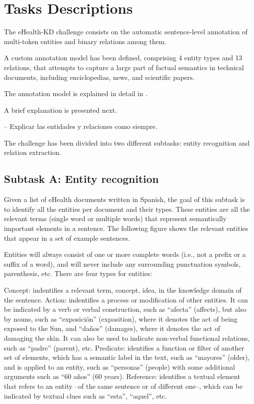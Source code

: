 \documentclass[a4paper,11pt,twocolumn,twoside]{article}
\begin{document}
\section{Tasks Descriptions}\label{sec:task}

The eHealth-KD challenge consists on the automatic sentence-level annotation
of multi-token entities and binary relations among them.

A custom annotation model has been defined, comprising 4 entity types and 13 relations,
that attempts to capture a large part of factual semantics in technical documents,
including enciclopedias, news, and scientific papers.

The annotation model is explained in detail in .

A brief explanation is presented next.

-- Explicar las entidades y relaciones como siempre.

The challenge has been divided into two different subtasks:
entity recognition and relation extraction.

\subsection{Subtask A: Entity recognition}
Given a list of eHealth documents written in Spanish, the goal of this subtask is to identify all the entities per document and their types. These entities are all the relevant terms (single word or multiple words) that represent semantically important elements in a sentence. The following figure shows the relevant entities that appear in a set of example sentences.

Entities will always consist of one or more complete words (i.e., not a prefix or a suffix of a word), and will never include any surrounding punctuation symbols, parenthesis, etc. There are four types for entities:

Concept: indentifies a relevant term, concept, idea, in the knowledge domain of the sentence.
Action: indentifies a process or modification of other entities. It can be indicated by a verb or verbal construction, such as “afecta” (affects), but also by nouns, such as “exposición” (exposition), where it denotes the act of being exposed to the Sun, and “daños” (damages), where it denotes the act of damaging the skin. It can also be used to indicate non-verbal functional relations, such as “padre” (parent), etc.
Predicate: identifies a function or filter of another set of elements, which has a semantic label in the text, such as “mayores” (older), and is applied to an entity, such as “personas” (people) with some additional arguments such as “60 años” (60 years).
Reference: identifies a textual element that refers to an entity –of the same sentence or of different one–, which can be indicated by textual clues such as “esta”, “aquel”, etc.
\end{document}
